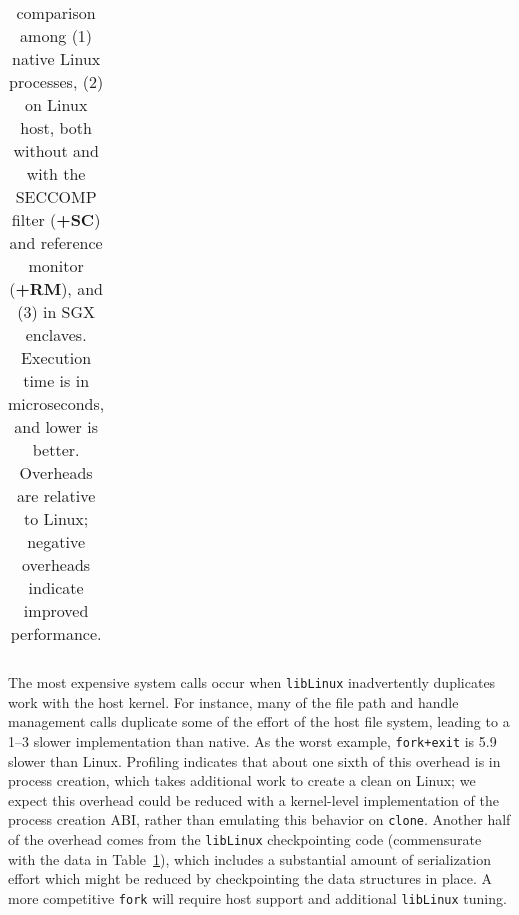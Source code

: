 \begin{table}[t!b!]
\begin{tabular}{|l|rr|rrr|rrr|}
\end{tabular}
\caption[\lmbench{} benchmarking results in Linux, KVM and \graphene{}]
{\lmbench{} comparison among (1) native Linux processes, (2) \graphene{} \picoprocs{} on Linux host, both without and with the SECCOMP filter ({\bf +SC}) and reference monitor ({\bf +RM}), and (3) \graphene{} in SGX enclaves.
Execution time is in microseconds, and lower is better. 
Overheads are relative to Linux; negative overheads indicate improved performance.} 
\label{tab:graphene:lmbench}
\end{table}


The most expensive system calls occur when {\tt libLinux} inadvertently duplicates work
with the host kernel.  
For instance, many of the file path and handle management calls duplicate some of the effort of the host file system,
leading to a 1--3\x{} slower implementation than native.
As the worst example,
{\tt fork+exit} is 5.9\x{} slower than Linux.
Profiling indicates that about one sixth of this overhead is in process creation, which 
takes additional work to create a clean \picoproc{} on Linux; we expect this overhead could be reduced
with a kernel-level implementation of the process creation ABI, rather than emulating this behavior on {\tt clone}.
Another half of the overhead comes from the
{\tt libLinux} checkpointing code (commensurate with the data in Table~\ref{tab:graphene:lmbench}), which 
includes a substantial amount of serialization effort which might be reduced by checkpointing the data structures in place.
A more competitive {\tt fork} will require host support and additional {\tt libLinux} tuning.



